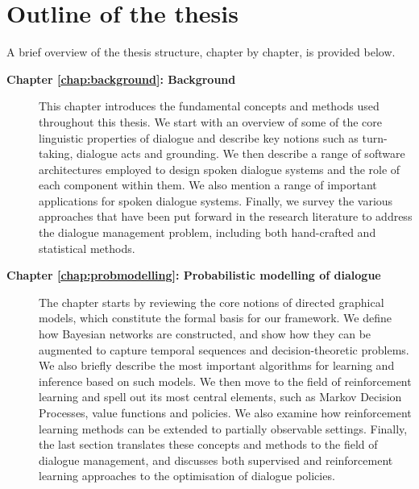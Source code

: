 
\section{Outline of the thesis}

A brief overview of the thesis structure, chapter by chapter, is provided below. 

\begin{description}
  \item[\textbf{Chapter \ref{chap:background}: Background}] \hfill  \vspace{2mm}
  
This chapter introduces the fundamental concepts and methods used throughout this thesis. We start with an overview of some of the core linguistic properties of dialogue and describe key notions such as turn-taking, dialogue acts and grounding.  We then describe a range of software architectures employed to design spoken dialogue systems and the role of each component within them.  We also mention a range of important applications for spoken dialogue systems. Finally, we survey the various approaches that have been put forward in the research literature to address the dialogue management problem, including both hand-crafted and statistical methods. \vspace{2mm}

  \item[\textbf{Chapter \ref{chap:probmodelling}: Probabilistic modelling of dialogue}] \hfill \vspace{2mm}

 The chapter starts by reviewing the core notions of directed graphical models, which constitute the formal basis for our framework.  We define how Bayesian networks are constructed, and show how they can be augmented to capture temporal sequences and decision-theoretic problems. We also briefly describe the most important algorithms for learning and inference based on such models.  We then  move to the field of reinforcement learning and spell out its most central elements, such as Markov Decision Processes, value functions and policies. We also examine how reinforcement learning methods can be extended to partially observable settings.  Finally, the last section translates these concepts and methods to the field of dialogue management, and discusses both supervised and reinforcement learning approaches to the optimisation of dialogue policies.
 

\end{description}

